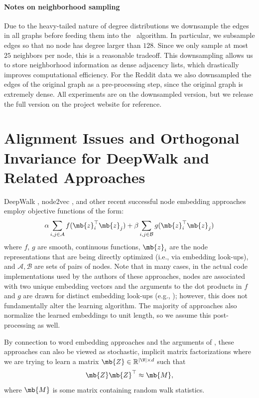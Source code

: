 \paragraph{Notes on neighborhood sampling}
Due to the heavy-tailed nature of degree distributions we downsample the edges in all graphs before feeding them into the \name\ algorithm.
In particular, we subsample edges so that no node has degree larger than $128$. 
Since we only sample at most $25$ neighbors per node, this is a reasonable tradeoff.
This downsampling allows us to store neighborhood information as dense adjacency lists, which drastically improves computational efficiency. 
For the Reddit data we also downsampled the edges of the original graph as a pre-processing step, since the original graph is extremely dense. 
All experiments are on the downsampled version, but we release the full version on the project website for reference. 


\section{Alignment Issues and Orthogonal Invariance for DeepWalk and Related Approaches}\label{inductive:sec:rotational}

DeepWalk \cite{perozzi2014deepwalk}, node2vec \cite{grover2016node2vec}, and other recent successful node embedding approaches employ objective functions of the form:
\begin{equation}\label{eq:n2vobj}
\alpha\sum_{i,j \in \mathcal{A}}f(\mb{z}_i^\top\mb{z}_{j}) + \beta\sum_{i,j \in \mathcal{B}}g(\mb{z}_i^\top\mb{z}_{j}) 
\end{equation}
where $f$, $g$ are smooth, continuous functions, $\mb{z}_i$ are the node representations that are being directly optimized (i.e., via embedding look-ups), and $\mathcal{A}, \mathcal{B}$ are sets of pairs of nodes. 
Note that in many cases, in the actual code implementations used by the authors of these approaches, nodes are associated with two unique embedding vectors and the arguments to the dot products in $f$ and $g$ are drawn for distinct embedding look-ups (e.g., \cite{grover2016node2vec,perozzi2014deepwalk}); however, this does not fundamentally alter the learning algorithm. 
The majority of approaches also normalize the learned embeddings to unit length, so we assume this post-processing as well.

By connection to word embedding approaches and the arguments of \cite{levy2014neural}, these approaches can also be viewed as stochastic, implicit matrix factorizations where we are trying to learn a matrix $\mb{Z} \in \mathbb{R}^{|\V| \times d}$ such that
\begin{equation}
\mb{Z}\mb{Z}^\top \approx \mb{M},
\end{equation}
where $\mb{M}$ is some matrix containing random walk statistics. 

